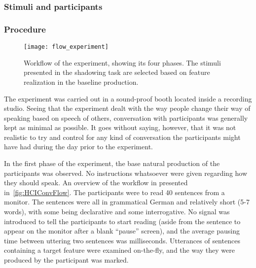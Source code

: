 

\subsubsection{Stimuli and participants}
\label{StimuliHCIConv}


\subsubsection{Procedure}
\label{ProcedureHCIConv}

\begin{figure}[!t]
	\centering
	\texttt{[image: flow\_experiment]}
	\caption[\acs{hci} convergence experiment workflow]{Workflow of the experiment, showing its four phases. The stimuli presented in the shadowing task are selected based on feature realization in the baseline production.}
	\label{fig:HCIConvFlow}
\end{figure}

The experiment was carried out in a sound-proof booth located inside a recording studio.
Seeing that the experiment dealt with the way people change their way of speaking based on speech of others, conversation with participants was generally kept as minimal as possible.
It goes without saying, however, that it was not realistic to try and control for any kind of conversation the participants might have had during the day prior to the experiment.

In the first phase of the experiment, the base natural production of the participants was observed.
No instructions whatsoever were given regarding how they should speak.
An overview of the workflow in presented in~\autoref{fig:HCIConvFlow}.
The participants were to read 40 sentences from a monitor.
The sentences were all in grammatical German and relatively short (5-7 words), with some being declarative and some interrogative.
No signal was introduced to tell the participants to start reading (aside from the sentence to appear on the monitor after a blank \enquote{pause} screen), and the average pausing time between uttering two sentences was
milliseconds.
Utterances of sentences containing a target feature were examined on-the-fly, and the way they were produced by the participant was marked.

